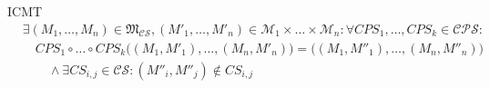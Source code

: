 \begin{copiedFrom}{ICMT}
\begin{align*}
    & \exists (M_1, \dots, M_n) \in \mathfrak{M}_{\mathcal{CS}}, (M'_1, \dots, M'_n) \in \mathcal{M}_1 \times \dots \times \mathcal{M}_n: \forall \mathit{CPS}_1, \ldots, \mathit{CPS}_k \in \mathcal{CPS} : \\
    & \hspace{1em} \mathit{CPS}_1 \circ \dots \circ \mathit{CPS}_k \big((M_1, M'_1), \dots, (M_n, M'_n) \big) = \big( (M_1, M''_1), \dots, (M_n, M''_n) \big)\\
    & \hspace{2em} \land \exists \mathit{CS}_{i,j} \in \mathcal{CS} : (M''_i, M''_j) \notin \mathit{CS}_{i,j}
\end{align*}


\end{copiedFrom}
